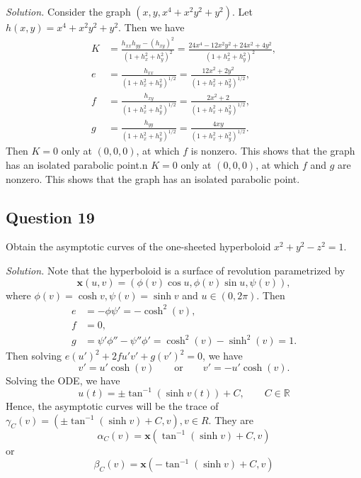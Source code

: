 \documentclass[12pt]{article}
\begin{document}
\textit{Solution.} Consider the graph $(x,y,x^4+x^2y^2+y^2)$. Let $h(x,y)=x^4+x^2y^2+y^2$. Then we have\begin{align*}
    K &= \frac{h_{xx}h_{yy}-(h_{xy})^2}{(1+h_x^2+h_y^2)^2} = \frac{24x^4-12x^2y^2+24x^2+4y^2}{(1+h_x^2+h_y^2)^2},\\
    e &= \frac{h_{xx}}{(1+h_x^2+h_y^2)^{1/2}}=\frac{12x^2+2y^2}{(1+h_x^2+h_y^2)^{1/2}},\\
    f &= \frac{h_{xy}}{(1+h_x^2+h_y^2)^{1/2}}=\frac{2x^2+2}{(1+h_x^2+h_y^2)^{1/2}},\\
    g &= \frac{h_{yy}}{(1+h_x^2+h_y^2)^{1/2}}=\frac{4xy}{(1+h_x^2+h_y^2)^{1/2}}.
\end{align*}
 Then $K=0$ only at $(0,0,0)$, at which $f$ is nonzero. This shows that the graph has an isolated parabolic point.n $K=0$ only at $(0,0,0)$, at which $f$ and $g$ are nonzero. This shows that the graph has an isolated parabolic point.
 
\subsection*{Question 19}
Obtain the asymptotic curves of the one-sheeted hyperboloid $x^2 + y^2 - z^2 = 1$.

\textit{Solution.} Note that the hyperboloid is a surface of revolution parametrized by \begin{equation*}
    \mathbf{x}(u,v) = (\phi(v)\cos{u},\phi(v)\sin{u},\psi(v)),
\end{equation*}
where $\phi(v) = \cosh{v},\psi(v)=\sinh{v}$ and $u\in(0,2\pi)$. Then\begin{align*}
    e &=  -\phi\psi'=-\cosh^2(v),\\
    f &= 0,\\
    g &= \psi'\phi''-\psi''\phi'=\cosh^2(v)-\sinh^2(v)=1.
\end{align*}
Then solving $e(u')^2 +2fu'v'+g(v')^2=0$, we have \begin{equation*}
    v'=u'\cosh(v) \qquad \text{or} \qquad v'=-u'\cosh(v).
\end{equation*}
Solving the ODE, we have \begin{equation*}
    u(t) = \pm \tan^{-1}(\sinh v(t)) + C,\qquad C\in \mathbb{R}
\end{equation*}
Hence, the asymptotic curves will be the trace of $\gamma_C(v) = (\pm\tan^{-1}( \sinh v)  + C,v), v\in R$. They are \begin{equation*}
    \alpha_C(v) = \mathbf{x}(\tan^{-1}( \sinh v)  + C,v)
\end{equation*} or \begin{equation*}
    \beta_C(v) = \mathbf{x}(-\tan^{-1}( \sinh v)  + C,v)
\end{equation*}
\end{document}
